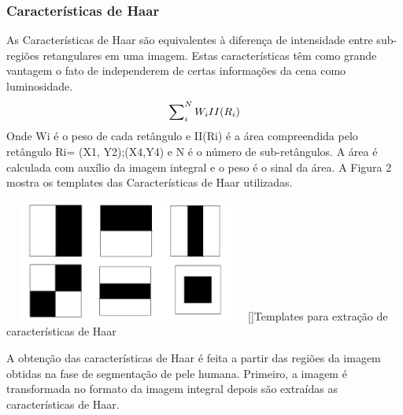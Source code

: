 \documentclass[a4paper,11pt]{article}
\newenvironment{Figure}
  {\par\medskip\noindent\minipage{\linewidth}}
    {\endminipage\par\medskip}
\begin{document}
\begin{multicols}{2}
\subsubsection{Características de Haar}
As Características de Haar são equivalentes à diferença de intensidade entre sub-regiões retangulares em uma imagem. Estas características têm como grande vantagem o fato de independerem de certas informações da cena como luminosidade\cite{ref:art2010}.
\begin{equation}
	\sum_{i}^{N}\nolimits{W_i}II(R_i)
\end{equation}
Onde Wi é o peso de cada retângulo e II(Ri) é a área compreendida pelo retângulo Ri= (X1, Y2);(X4,Y4) e N é o número de sub-retângulos. A área é calculada com auxílio da imagem integral e o peso é o sinal da área. A Figura 2 mostra os templates das Características de Haar utilizadas.
\begin{Figure}
	\centering 
	\includegraphics[width=8cm, height=4cm]{imagem2}
	[]{Templates para extração de características de Haar}
	\label{medium}
\end{Figure}
A obtenção das características de Haar é feita a partir das regiões da imagem obtidas na fase de segmentação de pele humana. Primeiro, a imagem é transformada no formato da imagem integral depois são extraídas as características de Haar.


\end{multicols}
\end{document}
